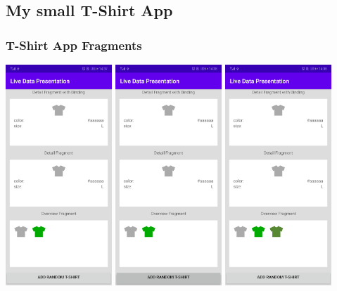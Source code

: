 \documentclass{beamer}
\begin{document}
	\subsection[My App]{My small T-Shirt App}
	\begin{frame}
		\frametitle{T-Shirt App Fragments}
		\includegraphics[width=0.3\textwidth]{screenshot_basic.png}
		\includegraphics[width=0.3\textwidth]{screenshot_pressed.png}
		\includegraphics[width=0.3\textwidth]{screenshot_released.png}		
	\end{frame}
	
\end{document}
